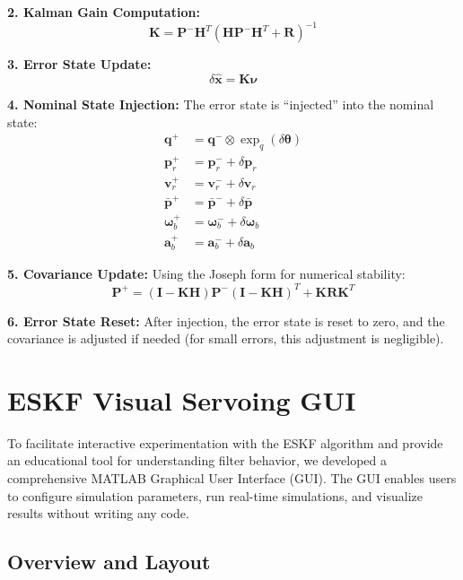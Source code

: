 \documentclass[11pt,a4paper]{article}
\newcommand{\quat}{\mathbf{q}}
\newcommand{\pr}{\mathbf{p}_r}
\newcommand{\vr}{\mathbf{v}_r}
\newcommand{\pbar}{\bar{\mathbf{p}}}
\newcommand{\bgyr}{\bm{\omega}_b}
\newcommand{\bacc}{\mathbf{a}_b}
\newcommand{\I}{\mathbf{I}}
\begin{document}
\textbf{2. Kalman Gain Computation:}
\begin{equation}
    \mathbf{K} = \mathbf{P}^- \mathbf{H}^T (\mathbf{H}\mathbf{P}^-\mathbf{H}^T + \mathbf{R})^{-1}
\end{equation}

\textbf{3. Error State Update:}
\begin{equation}
    \delta\hat{\mathbf{x}} = \mathbf{K} \bm{\nu}
\end{equation}

\textbf{4. Nominal State Injection:} The error state is ``injected'' into the nominal state:
\begin{align}
    \quat^+ &= \quat^- \otimes \exp_q(\delta\bm{\theta}) \\
    \pr^+ &= \pr^- + \delta\pr \\
    \vr^+ &= \vr^- + \delta\vr \\
    \pbar^+ &= \pbar^- + \delta\pbar \\
    \bgyr^+ &= \bgyr^- + \delta\bgyr \\
    \bacc^+ &= \bacc^- + \delta\bacc
\end{align}

\textbf{5. Covariance Update:} Using the Joseph form for numerical stability:
\begin{equation}
    \mathbf{P}^+ = (\I - \mathbf{K}\mathbf{H}) \mathbf{P}^- (\I - \mathbf{K}\mathbf{H})^T + \mathbf{K} \mathbf{R} \mathbf{K}^T
\end{equation}

\textbf{6. Error State Reset:} After injection, the error state is reset to zero, and the covariance is adjusted if needed (for small errors, this adjustment is negligible).

\section{ESKF Visual Servoing GUI}
\label{sec:gui}

To facilitate interactive experimentation with the ESKF algorithm and provide an educational tool for understanding filter behavior, we developed a comprehensive MATLAB Graphical User Interface (GUI). The GUI enables users to configure simulation parameters, run real-time simulations, and visualize results without writing any code.

\subsection{Overview and Layout}
\end{document}
